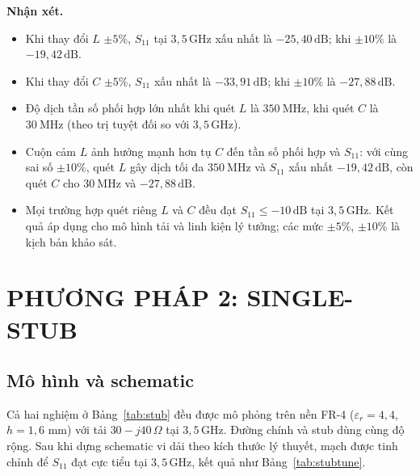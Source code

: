 \documentclass[a4paper]{report}
\newcommand\dB{\,\mathrm{dB}}
\newcommand\GHz{\,\mathrm{GHz}}
\begin{document}
\textbf{Nhận xét.}
\begin{itemize}
  \item Khi thay đổi $L$ $\pm5\%$, $S_{11}$ tại $3{,}5\GHz$ xấu nhất là $-25{,}40\dB$; khi $\pm10\%$ là $-19{,}42\dB$.
  \item Khi thay đổi $C$ $\pm5\%$, $S_{11}$ xấu nhất là $-33{,}91\dB$; khi $\pm10\%$ là $-27{,}88\dB$.
  \item Độ dịch tần số phối hợp lớn nhất khi quét $L$ là $350\ \mathrm{MHz}$, khi quét $C$ là $30\ \mathrm{MHz}$ (theo trị tuyệt đối so với $3{,}5\GHz$).
  \item Cuộn cảm $L$ ảnh hưởng mạnh hơn tụ $C$ đến tần số phối hợp và $S_{11}$: với cùng sai số $\pm10\%$, quét $L$ gây dịch tối đa $350\ \mathrm{MHz}$ và $S_{11}$ xấu nhất $-19{,}42\dB$, còn quét $C$ cho $30\ \mathrm{MHz}$ và $-27{,}88\dB$.
  \item Mọi trường hợp quét riêng $L$ và $C$ đều đạt $S_{11}\le-10\dB$ tại $3{,}5\GHz$. Kết quả áp dụng cho mô hình tải và linh kiện lý tưởng; các mức $\pm5\%$, $\pm10\%$ là kịch bản khảo sát.
\end{itemize}

\section{PHƯƠNG PHÁP 2: SINGLE-STUB}
\subsection{Mô hình và schematic}
Cả hai nghiệm ở Bảng~\ref{tab:stub} đều được mô phỏng trên nền FR-4 ($\varepsilon_r=4{,}4$, $h=1{,}6$ mm) với tải $30-j40\,\Omega$ tại $3{,}5\GHz$. Đường chính và stub dùng cùng độ rộng. Sau khi dựng schematic vi dải theo kích thước lý thuyết, mạch được tinh chỉnh để $S_{11}$ đạt cực tiểu tại $3{,}5\GHz$, kết quả như Bảng~\ref{tab:stubtune}.

\begin{table}[H]
\caption{Kích thước stub sau tinh chỉnh}\label{tab:stubtune}
\centering\footnotesize\setlength\tabcolsep{3pt}
\end{table}
\end{document}
